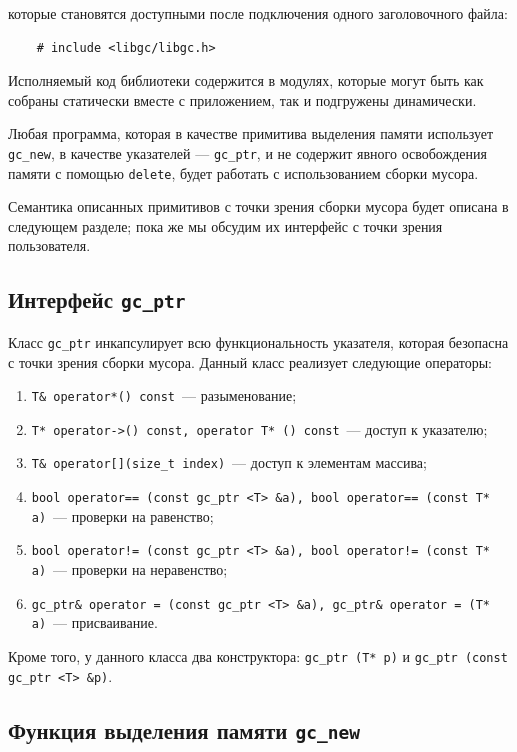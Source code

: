 которые становятся доступными после подключения одного заголовочного файла:

\begin{lstlisting}
    # include <libgc/libgc.h>
\end{lstlisting}

Исполняемый код библиотеки содержится в модулях, которые могут быть как собраны статически вместе
с приложением, так и подгружены динамически.

Любая программа, которая в качестве примитива выделения памяти использует \lstinline{gc_new}, в качестве
указателей --- \lstinline{gc_ptr}, и не содержит явного освобождения памяти с помощью \lstinline{delete}, будет
работать с использованием сборки мусора.

Семантика описанных примитивов с точки зрения сборки мусора будет описана в следующем разделе; пока же
мы обсудим их интерфейс с точки зрения пользователя.

\subsection{Интерфейс \lstinline{gc_ptr}}

Класс \lstinline{gc_ptr} инкапсулирует всю функциональность указателя, которая безопасна с точки зрения
сборки мусора. Данный класс реализует следующие операторы:

\begin{enumerate}
\item \lstinline{T& operator*() const}~--- разыменование;
\item \lstinline{T* operator->() const, operator T* () const}~--- доступ к указателю;
\item \lstinline{T& operator[](size_t index)}~--- доступ к элементам массива;
\item \lstinline{bool operator== (const gc_ptr <T> &a), bool operator== (const T* a)}~--- проверки на равенство;
\item \lstinline{bool operator!= (const gc_ptr <T> &a), bool operator!= (const T* a)}~--- проверки на неравенство;
\item \lstinline{gc_ptr& operator = (const gc_ptr <T> &a), gc_ptr& operator = (T* a)}~--- присваивание.
\end{enumerate}

Кроме того, у данного класса два конструктора: \lstinline{gc_ptr (T* p)} и \lstinline{gc_ptr (const gc_ptr <T> &p)}. 

\subsection{Функция выделения памяти \lstinline{gc_new}}

